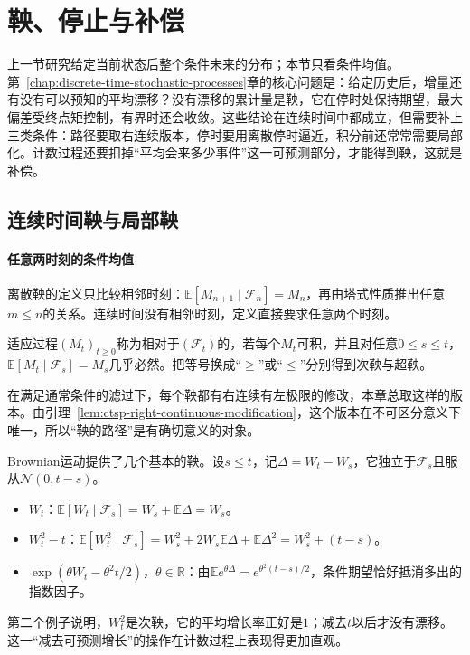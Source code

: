 \section{鞅、停止与补偿}
\label{sec:ctsp-martingales}

上一节研究给定当前状态后整个条件未来的分布；本节只看条件均值。第~\ref{chap:discrete-time-stochastic-processes}章的核心问题是：给定历史后，增量还有没有可以预知的平均漂移？没有漂移的累计量是鞅，它在停时处保持期望，最大偏差受终点矩控制，有界时还会收敛。这些结论在连续时间中都成立，但需要补上三类条件：路径要取右连续版本，停时要用离散停时逼近，积分前还常常需要局部化。计数过程还要扣掉“平均会来多少事件”这一可预测部分，才能得到鞅，这就是补偿。

\subsection{连续时间鞅与局部鞅}
\label{sec:ctsp-continuous-martingales}

\paragraph{任意两时刻的条件均值}
离散鞅的定义只比较相邻时刻：$\mathbb E[M_{n+1}\mid\mathcal F_n]=M_n$，再由塔式性质推出任意$m\leq n$的关系。连续时间没有相邻时刻，定义直接要求任意两个时刻。

\begin{definition}[连续时间鞅]
  \label{def:ctsp-martingale}
  适应过程$(M_t)_{t\geq0}$称为相对于$(\mathcal F_t)$的，若每个$M_t$可积，并且对任意$0\leq s\leq t$，$\mathbb E[M_t\mid\mathcal F_s]=M_s$几乎必然。把等号换成“$\geq$”或“$\leq$”分别得到次鞅与超鞅。
\end{definition}

在满足通常条件的滤过下，每个鞅都有右连续有左极限的修改，本章总取这样的版本。由引理~\ref{lem:ctsp-right-continuous-modification}，这个版本在不可区分意义下唯一，所以“鞅的路径”是有确切意义的对象。

Brownian运动提供了几个基本的鞅。设$s\leq t$，记$\Delta=W_t-W_s$，它独立于$\mathcal F_s$且服从$\mathcal N(0,t-s)$。
\begin{itemize}
  \item $W_t$：$\mathbb E[W_t\mid\mathcal F_s]=W_s+\mathbb E\Delta=W_s$。
  \item $W_t^2-t$：$\mathbb E[W_t^2\mid\mathcal F_s]=W_s^2+2W_s\mathbb E\Delta+\mathbb E\Delta^2=W_s^2+(t-s)$。
  \item $\exp(\theta W_t-\theta^2t/2)$，$\theta\in\mathbb R$：由$\mathbb Ee^{\theta\Delta}=e^{\theta^2(t-s)/2}$，条件期望恰好抵消多出的指数因子。
\end{itemize}
第二个例子说明，$W_t^2$是次鞅，它的平均增长率正好是$1$；减去$t$以后才没有漂移。这一“减去可预测增长”的操作在计数过程上表现得更加直观。

